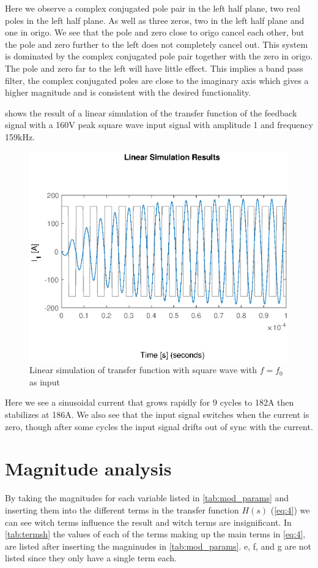 Here we observe a complex conjugated pole pair in the left half plane, two real poles in the left half plane. As well as three zeros, two in the left half plane and one in origo. We see that the pole and zero close to origo cancel each other, but the pole and zero further to the left does not completely cancel out. This system is dominated by the complex conjugated pole pair together with the zero in origo. The pole and zero far to the left will have little effect. This implies a band pass filter, the complex conjugated poles are close to the imaginary axis which gives a higher magnitude and is consistent with the desired functionality.

 shows the result of a linear simulation of the transfer function of the feedback signal with a 160V peak square wave input signal with amplitude 1 and frequency 159kHz.

\begin{figure}[H]
    \centering
    \includegraphics[width=\textwidth]{img/FeedBackSimulation.eps}
    \caption{Linear simulation of transfer function with square wave with $f=f_0$ as input}
    \label{fig:fblinsim}
\end{figure}

Here we see a sinusoidal current that grows rapidly for 9 cycles to 182A then stabilizes at 186A. We also see that the input signal switches when the current is zero, though after some cycles the input signal drifts out of sync with the current.

\newpage
\section{Magnitude analysis}
By taking the magnitudes for each variable listed in \cref{tab:mod_params} and inserting them into the different terms in the transfer function $H(s)$ (\cref{eq:4}) we can see witch terms influence the result and witch terms are insignificant. In \cref{tab:termsh} the values of each of the terms making up the main terms in \cref{eq:4}, are listed after inserting the magninudes in \cref{tab:mod_params}. e, f, and g are not listed since they only have a single term each.

